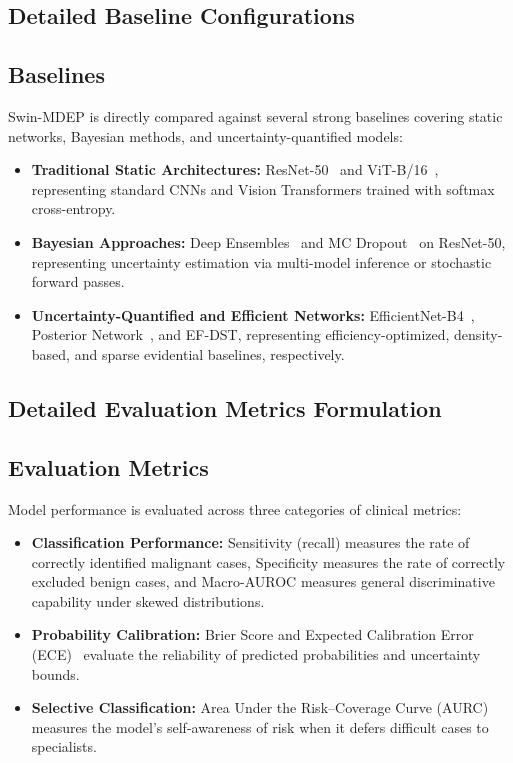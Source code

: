 \documentclass[letterpaper]{article} %
\begin{document}
\subsection{Detailed Baseline Configurations}
\subsection{Baselines}\label{subsec:baselines}

Swin-MDEP is directly compared against several strong baselines covering static networks, Bayesian methods, and uncertainty-quantified models:
\begin{itemize}
    \item \textbf{Traditional Static Architectures:} ResNet-50~\cite{he2016deep} and ViT-B/16~\cite{dosovitskiy2021image}, representing standard CNNs and Vision Transformers trained with softmax cross-entropy.
    \item \textbf{Bayesian Approaches:} Deep Ensembles~\cite{lakshminarayanan2017simple} and MC Dropout~\cite{gal2016dropout} on ResNet-50, representing uncertainty estimation via multi-model inference or stochastic forward passes.
    \item \textbf{Uncertainty-Quantified and Efficient Networks:} EfficientNet-B4~\cite{tan2019efficientnet}, Posterior Network~\cite{charpentier2020posterior}, and EF-DST, representing efficiency-optimized, density-based, and sparse evidential baselines, respectively.
\end{itemize}


\subsection{Detailed Evaluation Metrics Formulation}
\subsection{Evaluation Metrics}\label{subsec:metrics}

Model performance is evaluated across three categories of clinical metrics:
\begin{itemize}
    \item \textbf{Classification Performance:} Sensitivity (recall) measures the rate of correctly identified malignant cases, Specificity measures the rate of correctly excluded benign cases, and Macro-AUROC measures general discriminative capability under skewed distributions.
    \item \textbf{Probability Calibration:} Brier Score and Expected Calibration Error (ECE)~\cite{naeini2015obtaining} evaluate the reliability of predicted probabilities and uncertainty bounds.
    \item \textbf{Selective Classification:} Area Under the Risk--Coverage Curve (AURC)~\cite{geifman2017selective, geifman2019selectivenet, jaeger2023call} measures the model's self-awareness of risk when it defers difficult cases to specialists.
\end{itemize}

\end{document}
